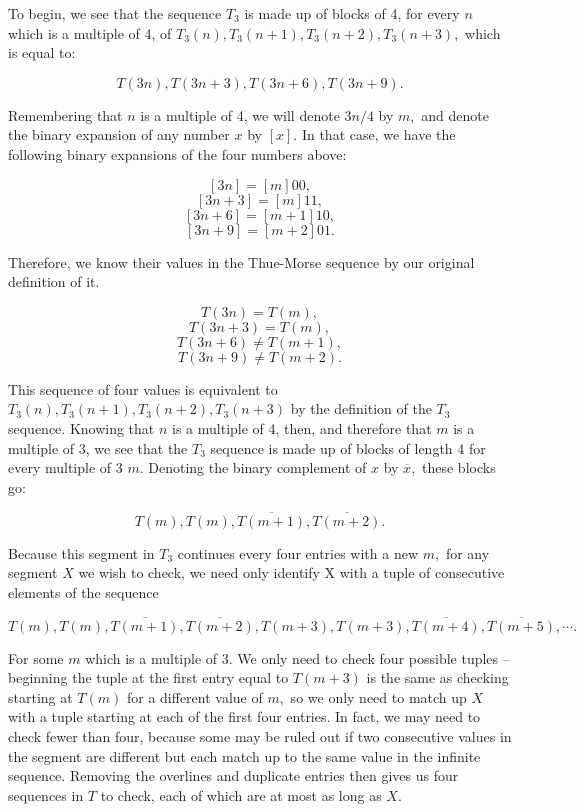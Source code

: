 \documentclass{article}
\begin{document}
To begin, we see that the sequence $T_3$ is made up of blocks of 4, for every $n$ which is a multiple of 4, of $T_3(n), T_3(n+1), T_3(n+2), T_3(n+3),$ which is equal to:

$$T(3n), T(3n+3), T(3n+6), T(3n+9).$$

 Remembering that $n$ is a multiple of 4, we will denote $3n/4$ by $m,$ and denote the binary expansion of any number $x$ by $[x].$ In that case, we have the following binary expansions of the four numbers above:

$$[3n] = [m]00,$$
$$[3n + 3] = [m]11,$$
$$[3n + 6] = [m+1]10,$$
$$[3n + 9] = [m+2]01.$$

Therefore, we know their values in the Thue-Morse sequence by our original definition of it.

$$T(3n) = T(m),$$
$$T(3n + 3) = T(m),$$
$$T(3n + 6) \neq T(m+1),$$
$$T(3n + 9) \neq T(m+2).$$

This sequence of four values is equivalent to $T_3(n), T_3(n+1), T_3(n+2), T_3(n+3)$ by the definition of the $T_3$ sequence. Knowing that $n$ is a multiple of 4, then, and therefore that $m$ is a multiple of 3, we see that the $T_3$ sequence is made up of blocks of length 4 for every multiple of 3 $m.$ Denoting the binary complement of $x$ by $\overline{x},$ these blocks go:

$$T(m), T(m), \overline{T(m+1)}, \overline{T(m+2)}.$$

Because this segment in $T_3$ continues every four entries with a new $m,$ for any segment $X$ we wish to check, we need only identify X with a tuple of consecutive elements of the sequence

$$T(m), T(m), \overline{T(m+1)}, \overline{T(m+2)}, T(m+3), T(m+3), \overline{T(m+4)}, \overline{T(m+5)}, \cdots .$$

For some $m$ which is a multiple of 3. We only need to check four possible tuples -- beginning the tuple at the first entry equal to $T(m+3)$ is the same as checking starting at $T(m)$ for a different value of $m,$ so we only need to match up $X$ with a tuple starting at each of the first four entries. In fact, we may need to check fewer than four, because some may be ruled out if two consecutive values in the segment are different but each match up to the same value in the infinite sequence. Removing the overlines and duplicate entries then gives us four sequences in $T$ to check, each of which are at most as long as $X.$
\end{document}
